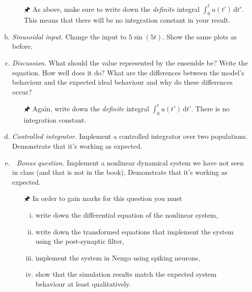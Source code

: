 \begin{enumerate}[a)]
		\begin{itemize}
			\item[{\symbolfont 🖈}] As above, make sure to write down the \emph{definite} integral $\int_0^t u(t') \,\mathrm{d}t'$. This means that there will be no integration constant in your result.
		\end{itemize}
		\item {} \emph{Sinusoidal input.} Change the input to $5\sin(5t)$. Show the same plots as before.
		\item {} \emph{Discussion.} What should the value represented by the ensemble be? Write the equation. How well does it do? What are the differences between the model's behaviour and the expected ideal behaviour and why do these differences occur?
		\begin{itemize}
			\item[{\symbolfont 🖈}] Again, write down the \emph{definite} integral $\int_0^t u(t') \,\mathrm{d}t'$. There is no integration constant.
    \end{itemize}
    \item {} \emph{Controlled integrator.} Implement a controlled integrator over two populations. Demonstrate that it's working as expected.
		\item {} \textit{{\symbolfont 🌟} Bonus question.} Implement a nonlinear dynamical system we have not seen in class (and that is not in the book). Demonstrate that it's working as expected.
		\begin{itemize}
			\item[{\symbolfont 🖈}] In order to gain marks for this question you must
			\begin{enumerate}[(i)]
				\item write down the differential equation of the nonlinear system,
				\item write down the transformed equations that implement the system using the post-synaptic filter,
				\item implement the system in Nengo using spiking neurons,
				\item show that the simulation results match the expected system behaviour at least qualitatively.
			\end{enumerate}
		\end{itemize}
	\end{enumerate}


